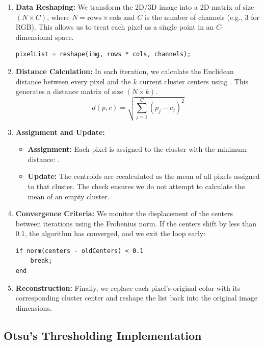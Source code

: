 \documentclass[12pt]{article}
\begin{document}
	 \begin{enumerate}
	 	\item \textbf{Data Reshaping:} We transform the 2D/3D image into a 2D matrix of size $(N \times C)$, where $N = \text{rows} \times \text{cols}$ and $C$ is the number of channels (e.g., 3 for RGB). This allows us to treat each pixel as a single point in an $C$-dimensional space.
	 	\begin{lstlisting}
pixelList = reshape(img, rows * cols, channels);
	 	\end{lstlisting}
	 	
	 	\item \textbf{Distance Calculation:} In each iteration, we calculate the Euclidean distance between every pixel and the $k$ current cluster centers using . This generates a distance matrix of size $(N \times k)$.
	 	\begin{equation}
	 		d(p, c) = \sqrt{\sum_{j=1}^{C} (p_j - c_j)^2}
	 	\end{equation}
	 	
	 	\item \textbf{Assignment and Update:} 
	 	\begin{itemize}
	 		\item \textbf{Assignment:} Each pixel is assigned to the cluster with the minimum distance: .
	 		\item \textbf{Update:} The centroids are recalculated as the mean of all pixels assigned to that cluster. The check  ensures we do not attempt to calculate the mean of an empty cluster.
	 	\end{itemize}
	 	
	 	\item \textbf{Convergence Criteria:} We monitor the displacement of the centers between iterations using the Frobenius norm. If the centers shift by less than 0.1, the algorithm has converged, and we exit the loop early:
	 	\begin{lstlisting}
if norm(centers - oldCenters) < 0.1
	break;
end
	 	\end{lstlisting}
	 	
	 	\item \textbf{Reconstruction:} Finally, we replace each pixel's original color with its corresponding cluster center and reshape the list back into the original image dimensions.
	 \end{enumerate}
	 
	 \subsection{Otsu's Thresholding Implementation}
	 
\end{document}
